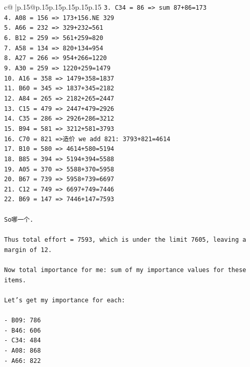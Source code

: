\documentclass{article}
\begin{document}
{\begin{supertabular}{c@{$\;$}|p{.15\linewidth}@{}p{.15\linewidth}p{.15\linewidth}p{.15\linewidth}p{.15\linewidth}p{.15\linewidth}}
{{{\texttt{3. C34 = 86 => sum 87+86=173} \\
\texttt{4. A08 = 156 => 173+156.NE 329} \\
\texttt{5. A66 = 232 => 329+232=561} \\
\texttt{6. B12 = 259 => 561+259=820} \\
\texttt{7. A58 = 134 => 820+134=954} \\
\texttt{8. A27 = 266 => 954+266=1220} \\
\texttt{9. A30 = 259 => 1220+259=1479} \\
\texttt{10. A16 = 358 => 1479+358=1837} \\
\texttt{11. B60 = 345 => 1837+345=2182} \\
\texttt{12. A84 = 265 => 2182+265=2447} \\
\texttt{13. C15 = 479 => 2447+479=2926} \\
\texttt{14. C35 = 286 => 2926+286=3212} \\
\texttt{15. B94 = 581 => 3212+581=3793} \\
\texttt{16. C70 = 821 =>造价 we add 821: 3793+821=4614} \\
\texttt{17. B10 = 580 => 4614+580=5194} \\
\texttt{18. B85 = 394 => 5194+394=5588} \\
\texttt{19. A05 = 370 => 5588+370=5958} \\
\texttt{20. B67 = 739 => 5958+739=6697} \\
\texttt{21. C12 = 749 => 6697+749=7446} \\
\texttt{22. B69 = 147 => 7446+147=7593} \\
\\ 
\texttt{So哪一个.} \\
\\ 
\texttt{Thus total effort = 7593, which is under the limit 7605, leaving a margin of 12.} \\
\\ 
\texttt{Now total importance for me: sum of my importance values for these items.} \\
\\ 
\texttt{Let's get my importance for each:} \\
\\ 
\texttt{{-} B09: 786} \\
\texttt{{-} B46: 606} \\
\texttt{{-} C34: 484} \\
\texttt{{-} A08: 868} \\
\texttt{{-} A66: 822} \\
}}}
\end{supertabular}}
\end{document}
